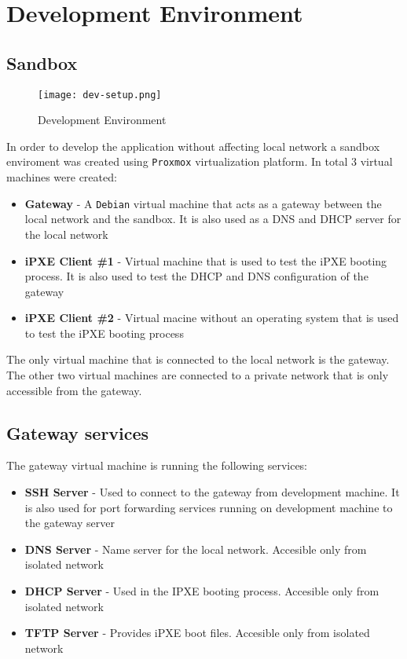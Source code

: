 \documentclass[../main.tex]{subfiles}
\begin{document}
\section{Development Environment}

\subsection{Sandbox}

\begin{figure}[H]
  \centering
  \texttt{[image: dev-setup.png]}
  \caption{Development Environment}
  \label{fig:dev-setup}
\end{figure}

In order to develop the application without affecting local network a sandbox enviroment was created using \texttt{Proxmox} \cite{proxmox} virtualization platform.
In total 3 virtual machines were created:

\begin{itemize}
  \item \textbf{Gateway} - A \texttt{Debian} \cite{debian} virtual machine that acts as a gateway between the local network and the sandbox. It is also used as a DNS and DHCP server for the local network
  \item \textbf{iPXE Client \#1} - Virtual machine that is used to test the iPXE booting process. It is also used to test the DHCP and DNS configuration of the gateway
  \item \textbf{iPXE Client \#2} - Virtual macine without an operating system that is used to test the iPXE booting process
\end{itemize}

The only virtual machine that is connected to the local network is the gateway. The other two virtual machines are connected to a private network that is only accessible from the gateway.

\subsection{Gateway services}

The gateway virtual machine is running the following services:

\begin{itemize}
  \item \textbf{SSH Server} - Used to connect to the gateway from development machine. It is also used for port forwarding services running on development machine to the gateway server
  \item \textbf{DNS Server} - Name server for the local network. Accesible only from isolated network
  \item \textbf{DHCP Server} - Used in the IPXE booting process. Accesible only from isolated network
  \item \textbf{TFTP Server} - Provides iPXE boot files. Accesible only from isolated network
\end{itemize}
\end{document}
